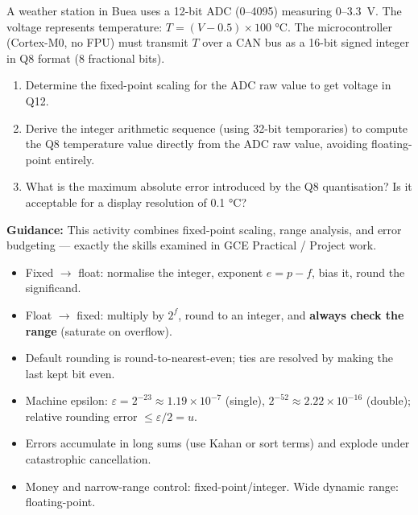 \documentclass[11pt]{article}
\newcommand{\cle}[1]{{\popxbold\color{popdark}#1}}
\begin{document}
\begin{experience}
A weather station in Buea uses a 12-bit ADC (0--4095) measuring 0--3.3~V. The voltage represents temperature: $T = (V - 0.5) \times 100$ °C. The microcontroller (Cortex-M0, no FPU) must transmit $T$ over a CAN bus as a 16-bit signed integer in Q8 format (8 fractional bits).
\begin{enumerate}
\item Determine the fixed-point scaling for the ADC raw value to get voltage in Q12.
\item Derive the integer arithmetic sequence (using 32-bit temporaries) to compute the Q8 temperature value directly from the ADC raw value, avoiding floating-point entirely.
\item What is the maximum absolute error introduced by the Q8 quantisation? Is it acceptable for a display resolution of 0.1 °C?
\end{enumerate}
\textbf{Guidance:} This activity combines fixed-point scaling, range analysis, and error budgeting — exactly the skills examined in GCE Practical / Project work.
\end{experience}

\begin{aretenir}
\begin{itemize}
\item Fixed $\to$ float: normalise the integer, exponent $e = p - f$, bias it, round the significand.
\item Float $\to$ fixed: multiply by $2^{f}$, round to an integer, and \textbf{always check the range} (saturate on overflow).
\item Default rounding is \cle{round-to-nearest-even}; ties are resolved by making the last kept bit even.
\item Machine epsilon: $\varepsilon = 2^{-23} \approx 1.19 \times 10^{-7}$ (single), $2^{-52} \approx 2.22 \times 10^{-16}$ (double); relative rounding error $\le \varepsilon/2 = u$.
\item Errors accumulate in long sums (use Kahan or sort terms) and explode under \cle{catastrophic cancellation}.
\item Money and narrow-range control: fixed-point/integer. Wide dynamic range: floating-point.
\end{itemize}
\end{aretenir}
\end{document}
